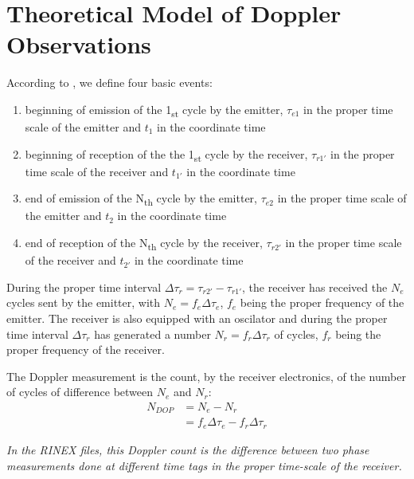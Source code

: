\section{Theoretical Model of Doppler Observations}
According to \cite{lemoine-2016}, we define four basic events:
\begin{enumerate}
    \item beginning of emission of the 1\textsubscript{st} cycle by the emitter, 
    \(\tau_{e1}\) in the proper time scale of the emitter and \(t_1\) in the coordinate 
    time
    
    \item beginning of reception of the the 1\textsubscript{st} cycle by the receiver, 
    \(\tau_{r1'}\) in the proper time scale of the receiver and 
    \(t_{1'}\) in the coordinate time

    \item end of emission of the N\textsubscript{th} cycle by the emitter, 
    \(\tau_{e2}\) in the proper time scale of the emitter and \(t_2\) in the coordinate 
    time
    
    \item end of reception of the N\textsubscript{th} cycle by the receiver, 
    \(\tau_{r2'}\) in the proper time scale of the receiver and 
    \(t_{2'}\) in the coordinate time
\end{enumerate}

During the proper time interval \(\Delta\tau_{r} = \tau_{r2'} - \tau_{r1'}\), 
the receiver has received the \(N_e\) cycles sent by the emitter, with \(N_e = f_e \Delta\tau_e\), 
\(f_e\) being the proper frequency of the emitter. The receiver is also equipped with
an oscilator and during the proper time interval \(\Delta\tau_{r}\) has generated 
a number \(N_r = f_r \Delta\tau_r\) of cycles, \(f_r\) being the proper frequency of the 
receiver.

The Doppler measurement is the count, by the receiver electronics, of the number 
of cycles of difference between \(N_e\) and \(N_r\):
\begin{equation}
    \begin{split}
    N_{DOP} & = N_e - N_r\\
            & = f_e \Delta\tau_e - f_r \Delta\tau_r
    \end{split}
\end{equation}

\emph{In the RINEX files, this Doppler count is the difference between two phase measurements 
done at different time tags in the proper time-scale of the receiver.}

